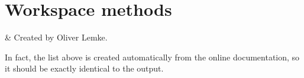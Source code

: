 \chapter{Workspace methods}
\label{app:methods}


 & Created by Oliver Lemke. \\
\stophistory



\noindent
In fact, the list above is created automatically from the online
documentation, so it should be exactly identical to the
 output. 


